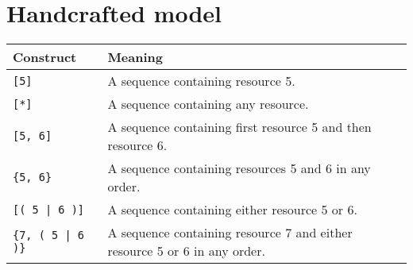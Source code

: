 \section{Handcrafted model}
\label{sec:apx_fitness_handcrafted}
\begin{tabular}[ht]{ll}\hline
	Construct &  Meaning \\\hline
	\verb![5]! & A sequence containing resource 5.\\
	\verb![*]! & A sequence containing any resource.\\
	\verb![5, 6]! & A sequence containing first resource 5 and then resource 6.\\
	\verb!{5, 6}! & A sequence containing resources 5 and 6 in any order.\\
	\verb![( 5 | 6 )]! & A sequence containing either resource 5 or 6.\\
	\verb!{7, ( 5 | 6 )}! & A sequence containing resource 7 and either resource 5
	or 6 in any order.\\
\end{tabular}
